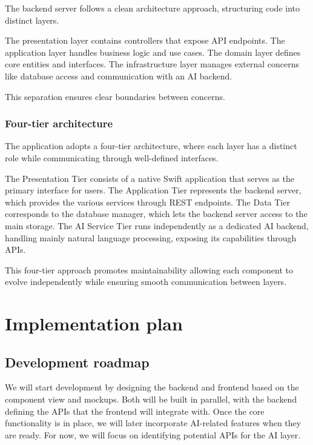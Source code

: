 \documentclass{article}
\begin{document}
The backend server follows a clean architecture approach, structuring code into distinct layers.

The presentation layer contains controllers that expose API endpoints.
The application layer handles business logic and use cases.
The domain layer defines core entities and interfaces.
The infrastructure layer manages external concerns like database access and communication with an AI backend.

This separation ensures clear boundaries between concerns.

\subsubsection{Four-tier architecture}

The application adopts a four-tier architecture, where each layer has a distinct role while communicating through well-defined interfaces.

The Presentation Tier consists of a native Swift application that serves as the primary interface for users.
The Application Tier represents the backend server, which provides the various services through REST endpoints.
The Data Tier corresponds to the database manager, which lets the backend server access to the main storage.
The AI Service Tier runs independently as a dedicated AI backend, handling mainly natural language processing, exposing its capabilities through APIs.

This four-tier approach promotes maintainability allowing each component to evolve independently while ensuring smooth communication between layers.

\section{Implementation plan}

\subsection{Development roadmap}

We will start development by designing the backend and frontend based on the component view and mockups. 
Both will be built in parallel, with the backend defining the APIs that the frontend will integrate with. Once the core functionality is in place, we will later incorporate AI-related features when they are ready. 
For now, we will focus on identifying potential APIs for the AI layer.
\end{document}
